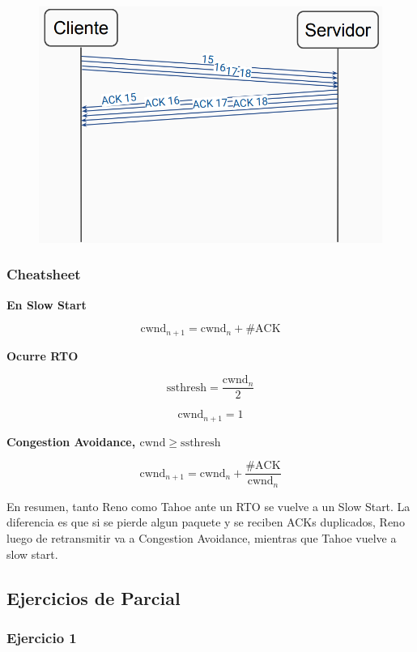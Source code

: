 \documentclass[titlepage,a4paper]{article}
\begin{document}
\begin{figure}[H]
\centering
\includegraphics[width=\textwidth]{imagenes/postCongA.png}
\end{figure}

\subsubsection{Cheatsheet}

\textbf{En Slow Start}

$$ \mathrm{cwnd}_{n+1} = \mathrm{cwnd}_{n} + \#\mathrm{ACK} $$

\textbf{Ocurre RTO}

$$ \mathrm{ssthresh} = \frac{\mathrm{cwnd}_n}{2} $$

$$ \mathrm{cwnd}_{n+1} = 1  $$

\textbf{Congestion Avoidance, $\mathrm{cwnd} \geq \mathrm{ssthresh} $}

$$ \mathrm{cwnd}_{n+1} = \mathrm{cwnd}_n + \frac{\#\mathrm{ACK}}{\mathrm{cwnd}_n} $$


En resumen, tanto Reno como Tahoe ante un RTO se vuelve a un Slow Start. La diferencia es que si se pierde algun paquete y se reciben ACKs duplicados, Reno luego de retransmitir va a Congestion Avoidance, mientras que Tahoe vuelve a slow start.

\subsection{Ejercicios de Parcial}

\subsubsection{Ejercicio 1}
\end{document}
